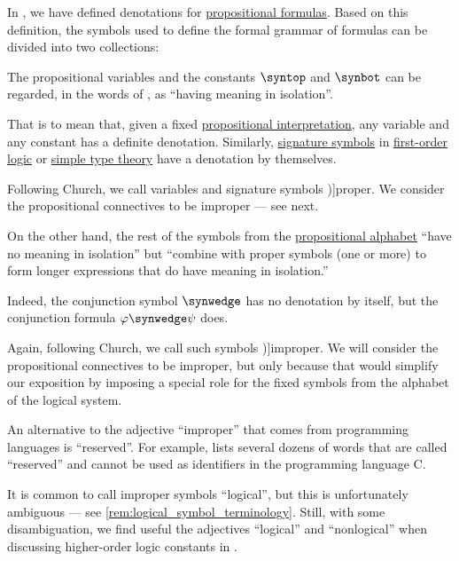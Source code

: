 \begin{concept}\label{con:improper_symbol}
  In , we have defined denotations for \hyperref[def:propositional_formula]{propositional formulas}. Based on this definition, the symbols used to define the formal grammar of formulas can be divided into two collections:
  \begin{thmenum}
     The propositional variables and the constants \( \syntop \) and \( \synbot \) can be regarded, in the words of \textcite[32]{Church1956LogicVol1}, as \enquote{having meaning in isolation}.

    That is to mean that, given a fixed \hyperref[def:propositional_interpretation]{propositional interpretation}, any variable and any constant has a definite denotation. Similarly, \hyperref[con:logical_system_signature]{signature symbols} in \hyperref[def:first_order_logic]{first-order logic} or \hyperref[con:simple_type_theory]{simple type theory} have a denotation by themselves.

    Following Church, we call variables and signature symbols \term[en=proper (symbol) (\cite[32]{Church1956LogicVol1})]{proper}. We consider the propositional connectives to be improper --- see next.

     On the other hand, the rest of the symbols from the \hyperref[def:propositional_alphabet]{propositional alphabet} \enquote{have no meaning in isolation} but \enquote{combine with proper symbols (one or more) to form longer expressions that do have meaning in isolation.}

    Indeed, the conjunction symbol \( {\synwedge} \) has no denotation by itself, but the conjunction formula \( \varphi \synwedge \psi \) does.

    Again, following Church, we call such symbols \term[en=improper (symbol) (\cite[32]{Church1956LogicVol1})]{improper}. We will consider the propositional connectives to be improper, but only because that would simplify our exposition by imposing a special role for the fixed symbols from the alphabet of the logical system.
  \end{thmenum}
\end{concept}
\begin{comments}
  \item An alternative to the adjective \enquote{improper} that comes from programming languages is \enquote{reserved}. For example, \cite[\S 6.4.1]{ISO:9899:2018} lists several dozens of words that are called \enquote{reserved} and cannot be used as identifiers in the programming language C.

  \item It is common to call improper symbols \enquote{logical}, but this is unfortunately ambiguous --- see \cref{rem:logical_symbol_terminology}. Still, with some disambiguation, we find useful the adjectives \enquote{logical} and \enquote{nonlogical} when discussing higher-order logic constants in .
\end{comments}

